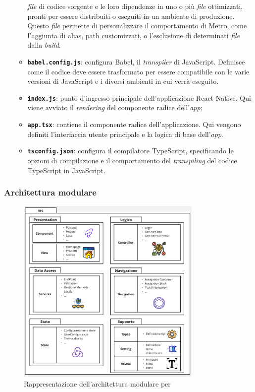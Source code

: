\begin{itemize}
\begin{itemize}
                  \textit{file} di codice sorgente e le loro dipendenze in uno o più \textit{file} ottimizzati, pronti per essere distribuiti 
                  o eseguiti in un ambiente di produzione. Questo \textit{file} permette di personalizzare il comportamento di Metro, come 
                  l'aggiunta di alias, path customizzati, o l'esclusione di determinati \textit{file} dalla \textit{build}.
            \item \textbf{\texttt{babel.config.js}}: configura Babel, il \textit{transpiler} di JavaScript. 
                  Definisce come il codice deve essere trasformato per essere compatibile con le varie versioni di JavaScript e i 
                  diversi ambienti in cui verrà eseguito.
            \item \textbf{\texttt{index.js}}: punto d'ingresso principale dell'applicazione React Native. Qui viene 
                  avviato il \textit{rendering} del componente radice dell'\textit{app};
            \item \textbf{\texttt{app.tsx}}: contiene il componente radice dell'applicazione. Qui vengono definiti l'interfaccia 
                  utente principale e la logica di base dell'\textit{app}.
            \item \textbf{\texttt{tsconfig.json}}: configura il compilatore TypeScript, specificando le opzioni di compilazione 
            e il comportamento del \textit{transpiling} del codice TypeScript in JavaScript.
          \end{itemize}
\end{itemize}
\subsubsection{Architettura modulare}

\begin{figure}[H]
      \centering
      \includegraphics[width=0.8\textwidth]{img/modules_architecture.png}
      \caption{Rappresentazione dell'architettura modulare per {\movi}}
      \label{fig:frontend architecture}
\end{figure}

